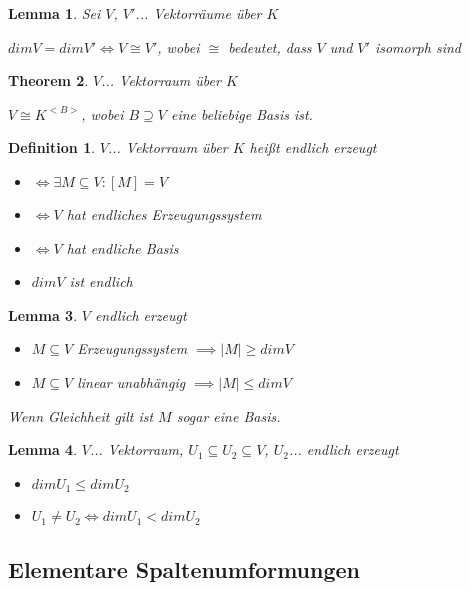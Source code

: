\documentclass[twocolumn]{article}
\newtheorem{theorem}{Theorem}[section]
\newtheorem{lemma}[theorem]{Lemma}
\newtheorem{definition}{Definition}[section]
\newcommand*{\logeq}{\Leftrightarrow}
\begin{document}
\begin{lemma}
	Sei $V$, $V'$... Vektorräume über $K$
	
	$dimV=dimV'\logeq V \cong V'$, wobei $\cong$ bedeutet, dass $V$ und $V'$ isomorph sind
\end{lemma}

\begin{theorem}
	$V$... Vektorraum über $K$
	
	$V \cong K^{<B>}$, wobei $B \supseteq V$ eine beliebige Basis ist.
\end{theorem}

\begin{definition}
	$V$... Vektorraum über $K$ heißt endlich erzeugt
	
	\begin{itemize}
		\item $\logeq \exists M \subseteq V : [M]=V$
		\item $\logeq V$ hat endliches Erzeugungssystem
		\item $\logeq V$ hat endliche Basis
		\item $dimV$ ist endlich
	\end{itemize}
\end{definition}

\begin{lemma}
	$V$ endlich erzeugt
	
	\begin{itemize}
		\item $M \subseteq V$ Erzeugungssystem $\implies |M| \geq dimV$
		\item $M \subseteq V$ linear unabhängig $\implies |M| \leq dimV$
	\end{itemize}

	Wenn Gleichheit gilt ist $M$ sogar eine Basis.
\end{lemma}

\begin{lemma}
	$V$... Vektorraum, $U_1 \subseteq U_2 \subseteq V$, $U_2$... endlich erzeugt
	
	\begin{itemize}
		\item $dimU_1 \leq dimU_2$
		\item $U_1 \neq U_2 \logeq dimU_1 < dimU_2$
	\end{itemize}
\end{lemma}

\subsection{Elementare Spaltenumformungen}
\end{document}
